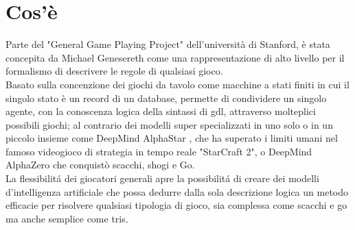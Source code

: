 \section{Cos'è} %
Parte del "General Game Playing Project" dell'università di Stanford,
è stata concepita da Michael Genesereth come una rappresentazione di alto livello per 
il formalismo di descrivere le regole di qualsiasi gioco. \\
Basato sulla concenzione dei giochi da tavolo come macchine a stati finiti in cui il singolo stato
è un record di un database,
permette di condividere un singolo agente, con la conoscenza logica della sintassi di gdl,
attraverso molteplici possibili giochi; al contrario dei modelli super specializzati in uno solo o 
in un piccolo insieme come DeepMind AlphaStar \cite{AlphaStar},
che ha superato i limiti umani nel famoso videogioco di strategia in tempo reale "StarCraft 2",
o DeepMind AlphaZero \cite{AlphaZero} che conquistò scacchi, shogi e Go. \\
La flessibilitá dei giocatori generali apre la possibilitá di creare dei modelli d'intelligenza artificiale 
che possa dedurre dalla sola descrizione logica un metodo efficacie per risolvere qualsiasi tipologia di gioco,
sia complessa come scacchi e go ma anche semplice come tris.  

